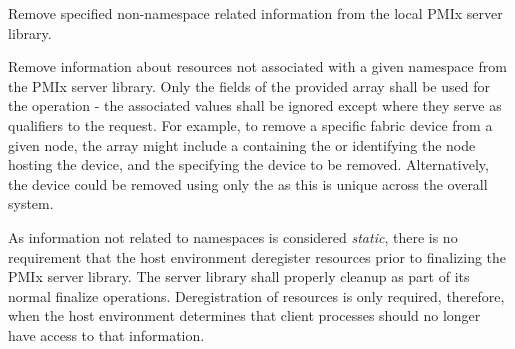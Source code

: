 \summary

Remove specified non-namespace related information from the local \ac{PMIx} server library.

\format


\begin{arglist}
\end{arglist}

\descr

Remove information about resources not associated with a given namespace from the \ac{PMIx} server library. Only the  fields of the provided  array shall be used for the operation - the associated values shall be ignored except where they serve as qualifiers to the request. For example, to remove a specific fabric device from a given node, the  array might include a  containing the  or  identifying the node hosting the device, and the  specifying the device to be removed. Alternatively, the device could be removed using only the  as this is unique across the overall system.

\returnsimple

\advicermstart
As information not related to namespaces is considered \emph{static}, there is no requirement that the host environment deregister resources prior to finalizing the \ac{PMIx} server library. The server library shall properly cleanup as part of its normal finalize operations. Deregistration of resources is only required, therefore, when the host environment determines that client processes should no longer have access to that information.

